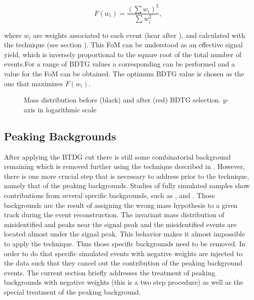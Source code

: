 \begin{equation}
\label{eqn:fom}
F(w_i) = \frac{\left(\sum{w_{i}}\right)^2}{\sum{w_{i}^2}},
\end{equation}

\noindent where $w_i$ are weights associated to each event (hear after \sWeights), and calculated with the \sPlot technique (see section ). 
This FoM can be understood as an effective signal yield, which is inversely proportional to the square root of the total number of events.For a range of BDTG values
a corresponding \sPlot can be performed and a value for the FoM can be obtained. The optimum BDTG value is chosen as the one that maximizes $F(w_i)$.


\begin{figure}[h]
\begin{center}
  \scalebox{1}{}
  \caption{Mass distribution before (black) and after (red) BDTG selection. $y$-axis in logarithmic scale}
  \label{mass_BDTG_selection}
\end{center}
\end{figure}

\subsection{Peaking Backgrounds}
\label{peaking_backgrounds}

After applying the BTDG cut there is still some combinatorial background remaining which is removed
further using the \sPlot technique described in . However, there is
one more crucial step that is necessary to address prior to the \sPlot technique, namely that of the peaking backgrounds.
Studies of fully simulated samples show contributions from several specific backgrounds, such as \BsJpsiKK, \BsJpsipipi and \BdJpsipipi.
Those backgrounds are the result of assigning the wrong mass hypothesis to a given track during the event reconstruction.  
The invariant mass distribution of misidentified \BdJpsipipi and \BsJpsipipi peaks near the \BsJpsiKpi signal peak
and the misidentified \BsJpsiKK events are located almost under the \BdJpsiKpi signal peak. 
This behavior makes it almost impossible to apply the \sPlot technique. Thus those specific backgrounds need to be removed. 
In order to do that specific simulated events with negative weights are injected to the data such that they cancel out the
contribution of the peaking background events. The current section briefly addresses the treatment of peaking backgrounds 
with negative weights (this is a two step procedure) as well as the special treatment of the \LbJpsippi peaking background.

